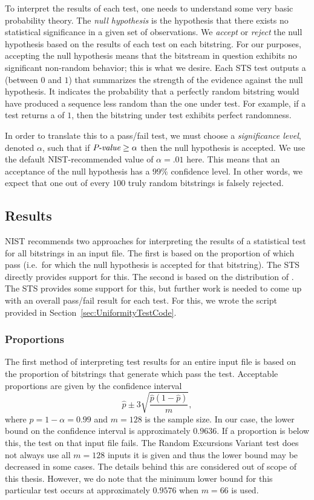To interpret the results of each test, one needs to understand some very basic probability theory. 
The \emph{null hypothesis} is the hypothesis that there exists no statistical significance in a given set of observations.
We \emph{accept} or \emph{reject} the null hypothesis based on the results of each test on each bitstring.
For our purposes, accepting the null hypothesis means that the bitstream in question exhibits no significant non-random behavior; this is what we desire.
Each STS test outputs a \pval (between $0$ and $1$) that summarizes the strength of the evidence against the null hypothesis. 
It indicates the probability that a perfectly random bitstring would have produced a sequence less random than the one under test.
For example, if a test returns a \pval of $1$, then the bitstring under test exhibits perfect randomness.

In order to translate this to a pass/fail test, we must choose a \emph{significance level}, denoted $\alpha$, such that if $\textit{P-value} \ge \alpha$ then the null hypothesis is accepted.
We use the default NIST-recommended value of $\alpha = .01$ here.
This means that an acceptance of the null hypothesis has a $99\%$ confidence level.
In other words, we expect that one out of every $100$ truly random bitstrings is falsely rejected.

\subsection{Results}
NIST recommends two approaches for interpreting the results of a statistical test for all bitstrings in an input file. 
The first is based on the proportion of \pvals which pass (i.e.\ for which the null hypothesis is accepted for that bitstring). 
The STS directly provides support for this.
The second is based on the distribution of \pvals.
The STS provides some support for this, but further work is needed to come up with an overall pass/fail result for each test. 
For this, we wrote the script provided in Section~\ref{sec:UniformityTestCode}.

\subsubsection{\pval Proportions}
The first method of interpreting test results for an entire input file is based on the proportion of bitstrings that generate \pvals which pass the test.
Acceptable proportions are given by the confidence interval
\begin{equation*}
\hat{p} \pm 3 \sqrt{ \frac{\hat{p}(1-\hat{p})}{m} },
\end{equation*}
where $\hat{p} = 1 - \alpha = 0.99$ and $m = 128$ is the sample size.
In our case, the lower bound on the confidence interval is approximately $0.9636$. 
If a proportion is below this, the test on that input file fails.
The Random Excursions Variant test does not always use all $m = 128$ inputs it is given and thus the lower bound may be decreased in some cases.
The details behind this are considered out of scope of this thesis. However, we do note that the minimum lower bound for this particular test occurs at approximately $0.9576$ when $m = 66$ is used.

